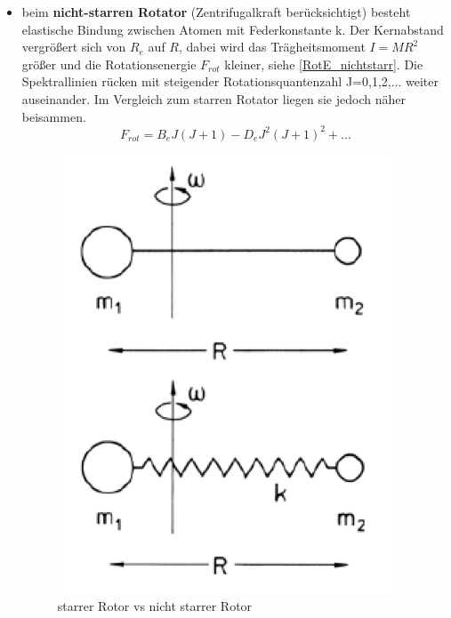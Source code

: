 \begin{itemize}
\begin{itemize}
            \item beim \textbf{nicht-starren Rotator} (Zentrifugalkraft berücksichtigt) besteht elastische Bindung zwischen Atomen mit Federkonstante k. Der Kernabstand vergrößert sich von $R_e$ auf $R$, dabei wird das Trägheitsmoment $I=MR^2$ größer und die Rotationsenergie $F_{rot}$ kleiner, siehe \ref{RotE_nichtstarr}. Die Spektrallinien rücken mit steigender Rotationsquantenzahl J=0,1,2,... weiter auseinander. Im Vergleich zum starren Rotator liegen sie jedoch näher beisammen.
                \begin{equation}
                   F_{rot}=B_eJ(J+1)-D_eJ^2(J+1)^2+...
                   \label{RotE_nichtstarr}
                    \end{equation}
    \begin{figure}[H]
    \centering
   \begin{minipage}[b]{.3\linewidth}
      \includegraphics[width=\linewidth]{resources/16-03-2012/StarrervsnichtstarrerRotor.png}
      \caption{starrer Rotor vs nicht starrer Rotor}

\end{minipage}
\end{figure}
\end{itemize}
\end{itemize}
